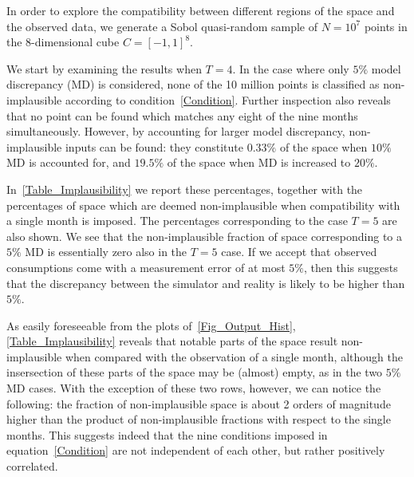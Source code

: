 \documentclass[a4paper, 12pt]{article}
\begin{document}
In order to explore the compatibility between different regions of the space and the observed data, we generate a Sobol quasi-random sample of $N = 10^7$ points in the 8-dimensional cube $C={[-1,1]}^8$.


We start by examining the results when $T=4$.
In the case where only $5\%$ model discrepancy (MD) is considered, none of the 10 million points is classified as non-implausible according to condition~\eqref{Condition}. Further inspection also reveals that no point can be found which matches any eight of the nine months simultaneously.
However, by accounting for larger model discrepancy, non-implausible inputs can be found: they constitute $0.33\%$ of the space when $10\%$ MD is accounted for, and $19.5\%$ of the space when MD is increased to $20\%$.





In~\autoref{Table_Implausibility} we report these percentages, together with the percentages of space which are deemed non-implausible when compatibility with a single month is imposed. The percentages corresponding to the case $T=5$ are also shown. We see that the non-implausible fraction of space corresponding to a $5\%$ MD is essentially zero also in the $T=5$ case. If we accept that observed consumptions come with a measurement error of at most $5\%$, then this suggests that the discrepancy between the simulator and reality is likely to be higher than $5\%$.


As easily foreseeable from the plots of~\autoref{Fig_Output_Hist}, \autoref{Table_Implausibility} reveals that notable parts of the space result non-implausible when compared with the observation of a single month, although the insersection of these parts of the space may be (almost) empty, as in the two $5\%$ MD cases. With the exception of these two rows, however, we can notice the following: the fraction of non-implausible space is about 2 orders of magnitude higher than the product of non-implausible fractions with respect to the single months. This suggests indeed that the nine conditions imposed in equation~\eqref{Condition} are not independent of each other, but rather positively correlated.
\end{document}
